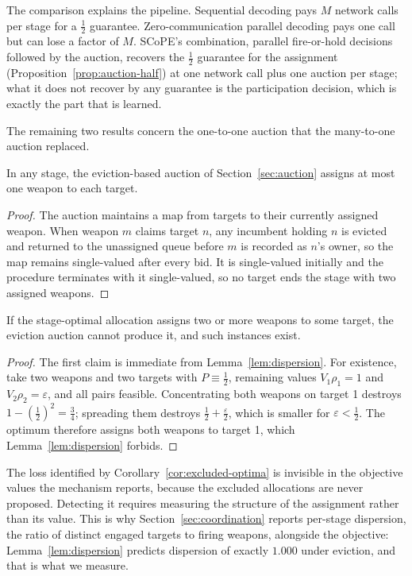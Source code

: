 The comparison explains the pipeline. Sequential decoding pays $M$ network calls per stage for a $\tfrac12$ guarantee. Zero-communication parallel decoding pays one call but can lose a factor of $M$. SCoPE's combination, parallel fire-or-hold decisions followed by the auction, recovers the $\tfrac12$ guarantee for the assignment (Proposition~\ref{prop:auction-half}) at one network call plus one auction per stage; what it does not recover by any guarantee is the participation decision, which is exactly the part that is learned.

The remaining two results concern the one-to-one auction that the many-to-one auction replaced.

\begin{lemma}
\label{lem:dispersion}
In any stage, the eviction-based auction of Section~\ref{sec:auction} assigns at most one weapon to each target.
\end{lemma}
\begin{proof}
The auction maintains a map from targets to their currently assigned weapon. When weapon $m$ claims target $n$, any incumbent holding $n$ is evicted and returned to the unassigned queue before $m$ is recorded as $n$'s owner, so the map remains single-valued after every bid. It is single-valued initially and the procedure terminates with it single-valued, so no target ends the stage with two assigned weapons.
\end{proof}

\begin{corollary}
\label{cor:excluded-optima}
If the stage-optimal allocation assigns two or more weapons to some target, the eviction auction cannot produce it, and such instances exist.
\end{corollary}
\begin{proof}
The first claim is immediate from Lemma~\ref{lem:dispersion}. For existence, take two weapons and two targets with $P \equiv \tfrac12$, remaining values $V_1\rho_1 = 1$ and $V_2\rho_2 = \varepsilon$, and all pairs feasible. Concentrating both weapons on target 1 destroys $1 - (\tfrac12)^2 = \tfrac34$; spreading them destroys $\tfrac12 + \tfrac{\varepsilon}{2}$, which is smaller for $\varepsilon < \tfrac12$. The optimum therefore assigns both weapons to target 1, which Lemma~\ref{lem:dispersion} forbids.
\end{proof}

The loss identified by Corollary~\ref{cor:excluded-optima} is invisible in the objective values the mechanism reports, because the excluded allocations are never proposed. Detecting it requires measuring the structure of the assignment rather than its value. This is why Section~\ref{sec:coordination} reports per-stage dispersion, the ratio of distinct engaged targets to firing weapons, alongside the objective: Lemma~\ref{lem:dispersion} predicts dispersion of exactly $1.000$ under eviction, and that is what we measure.


